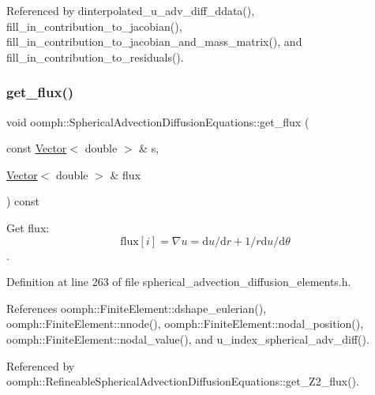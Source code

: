 Referenced by dinterpolated\+\_\+u\+\_\+adv\+\_\+diff\+\_\+ddata(), fill\+\_\+in\+\_\+contribution\+\_\+to\+\_\+jacobian(), fill\+\_\+in\+\_\+contribution\+\_\+to\+\_\+jacobian\+\_\+and\+\_\+mass\+\_\+matrix(), and fill\+\_\+in\+\_\+contribution\+\_\+to\+\_\+residuals().

\mbox{\label{classoomph_1_1SphericalAdvectionDiffusionEquations_a52e4a713aa779de8cd57ec5faa60a709}} 
\subsubsection{\texorpdfstring{get\+\_\+flux()}{get\_flux()}}
{\footnotesize\ttfamily void oomph\+::\+Spherical\+Advection\+Diffusion\+Equations\+::get\+\_\+flux (\begin{DoxyParamCaption}\item[{const \hyperlink{classoomph_1_1Vector}{Vector}$<$ double $>$ \&}]{s,  }\item[{\hyperlink{classoomph_1_1Vector}{Vector}$<$ double $>$ \&}]{flux }\end{DoxyParamCaption}) const\hspace{0.3cm}{\ttfamily [inline]}}



Get flux\+: \[ \mbox{flux}[i] = \nabla u = \mbox{d}u / \mbox{d} r + 1/r \mbox{d}u / \mbox{d} \theta \]. 



Definition at line 263 of file spherical\+\_\+advection\+\_\+diffusion\+\_\+elements.\+h.



References oomph\+::\+Finite\+Element\+::dshape\+\_\+eulerian(), oomph\+::\+Finite\+Element\+::nnode(), oomph\+::\+Finite\+Element\+::nodal\+\_\+position(), oomph\+::\+Finite\+Element\+::nodal\+\_\+value(), and u\+\_\+index\+\_\+spherical\+\_\+adv\+\_\+diff().



Referenced by oomph\+::\+Refineable\+Spherical\+Advection\+Diffusion\+Equations\+::get\+\_\+\+Z2\+\_\+flux().

\mbox{\label{classoomph_1_1SphericalAdvectionDiffusionEquations_a139999156e95fba4e789d7b72def465e}} 
